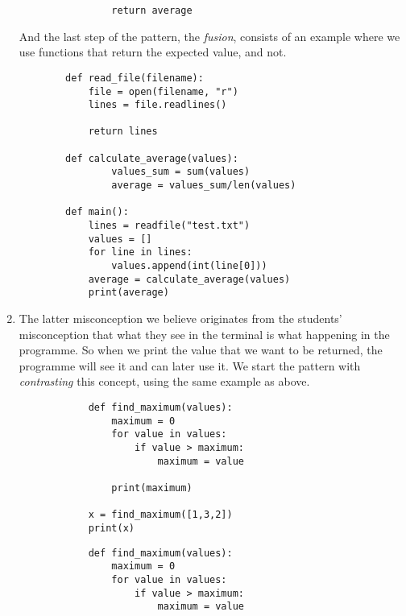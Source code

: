 \begin{enumerate}
\begin{verbatim}
                return average
        \end{verbatim}
\hfill

    And the last step of the pattern, the \emph{fusion}, consists of an 
example where we use functions that return the expected value, and not.
    \hfill

        \begin{verbatim}
        def read_file(filename):
            file = open(filename, "r")
            lines = file.readlines()

            return lines
            
        def calculate_average(values):
                values_sum = sum(values)
                average = values_sum/len(values)

        def main():
            lines = readfile("test.txt")
            values = []
            for line in lines:
                values.append(int(line[0]))
            average = calculate_average(values)
            print(average)
        \end{verbatim}
\hfill

    \item The latter misconception we believe originates from the 
students' misconception that what they see in the terminal is what 
happening in the programme. So when we print the value that we want to 
be returned, the programme will see it and can later use it. We start 
the pattern with \emph{contrasting} this concept, using the same 
example as above.

        \hfill
     \begin{minipage}[t]{0.45\columnwidth}
        \begin{verbatim}
            def find_maximum(values):
                maximum = 0
                for value in values:
                    if value > maximum:
                        maximum = value
    
                print(maximum)

            x = find_maximum([1,3,2])
            print(x)
        \end{verbatim}
    \end{minipage}
\hfill
    \begin{minipage}[t]{0.45\columnwidth}
        \begin{verbatim}
            def find_maximum(values):
                maximum = 0
                for value in values:
                    if value > maximum:
                        maximum = value
                        

\end{verbatim}
\end{minipage}
\end{enumerate}
